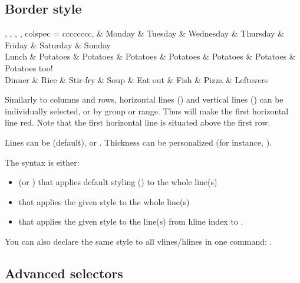 \subsection{Border style}

\begin{Code}
\begin{tblr}{
	,
	,
	,
	,
	colspec = {cccccccc},
}
       & Monday   & Tuesday  & Wednesday & Thursday  & Friday   & Saturday & Sunday \\
Lunch  & Potatoes & Potatoes & Potatoes  & Potatoes  & Potatoes & Potatoes & Potatoes too! \\ 
Dinner & Rice     & Stir-fry & Soup      & Eat out   & Fish     & Pizza    & Leftovers\\
\end{tblr}
\end{Code}

Similarly to columns and rows, horizontal lines () and vertical lines () can be individually selected, or by group or range. Thus  will make the first horizontal line red. Note that the first horizontal line is situated above the first row.

Lines can be  (default),  or . Thickness can be personalized (for instance, \snippet{2pt}). 

The syntax is either: 
\begin{itemize}
	\item {} (or ) that applies default styling () to the whole line(s)
	\item {} that applies the given style to the whole line(s)
	\item {} that applies the given style to the line(s) from hline index  to .
\end{itemize}

You can also declare the same style to all vlines/hlines in one command: .

\subsection{Advanced selectors}

